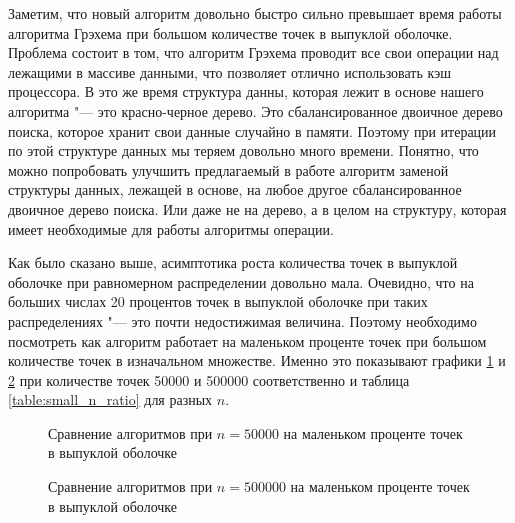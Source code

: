 Заметим, что новый алгоритм довольно быстро сильно превышает время работы алгоритма Грэхема при большом количестве точек в выпуклой оболочке. Проблема состоит в том, что алгоритм Грэхема проводит все свои операции над лежащими в массиве данными, что позволяет отлично использовать кэш процессора. В это же время структура данны, которая лежит в основе нашего алгоритма "--- это красно-черное дерево. Это сбалансированное двоичное дерево поиска, которое хранит свои данные случайно в памяти. Поэтому при итерации по этой структуре данных мы теряем довольно много времени. Понятно, что можно попробовать улучшить предлагаемый в работе алгоритм заменой структуры данных, лежащей в основе, на любое другое сбалансированное двоичное дерево поиска. Или даже не на дерево, а в целом на структуру, которая имеет необходимые для работы алгоритмы операции.

Как было сказано выше, асимптотика роста количества точек в выпуклой оболочке при равномерном распределении довольно мала. Очевидно, что на больших числах 20 процентов точек в выпуклой оболочке при таких распределениях "--- это почти недостижимая величина. Поэтому необходимо посмотреть как алгоритм работает на маленьком проценте точек при большом количестве точек в изначальном множестве. Именно это показывают графики \ref{img:comparison2_50000} и \ref{img:comparison2_500000} при количестве точек 50000 и 500000 соответственно и таблица \ref{table:small_n_ratio} для разных $n$.

\begin{figure}[hbt]
	\centering
	
	\caption{Сравнение алгоритмов при $n = 50000$ на маленьком проценте точек в выпуклой оболочке}
	\label{img:comparison2_50000}
\end{figure}

\begin{figure}[hbt]
	\centering
	
	\caption{Сравнение алгоритмов при $n = 500000$ на маленьком проценте точек в выпуклой оболочке}
	\label{img:comparison2_500000}
\end{figure}

